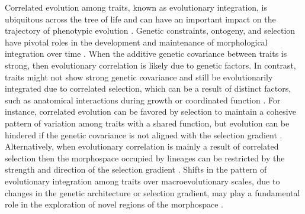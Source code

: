Correlated evolution among traits, known as evolutionary integration, is ubiquitous across the tree of life and can have an important impact on the trajectory of phenotypic evolution \citep{Olson_Miller_1958, klingenberg_evolutionary_2013, armbruster_integrated_2014, klingenberg_review_2014, goswami_macroevolutionary_2014, goswami_fossil_2015, melo_modularity:_2016}. Genetic constraints, ontogeny, and selection have pivotal roles in the development and maintenance of morphological integration over time \citep{arnold_constraints_1992, arnold_adaptive_2001, pigliucci_evolvability_2004, goswami_fossil_2015, melo_modularity:_2016}. When the additive genetic covariance between traits is strong, then evolutionary correlation is likely due to genetic factors. In contrast, traits might not show strong genetic covariance and still be evolutionarily integrated due to correlated selection, which can be a result of distinct factors, such as anatomical interactions during growth or coordinated function \citep{armbruster_causes_1996, armbruster_integrated_2014}. For instance, correlated evolution can be favored by selection to maintain a cohesive pattern of variation among traits with a shared function, but evolution can be hindered if the genetic covariance is not aligned with the selection gradient \citep{lande_quantitative_1979, schluter_adaptive_1996, villmoare_morphological_2012, goswami_macroevolutionary_2014}. Alternatively, when evolutionary correlation is mainly a result of correlated selection then the morphospace occupied by lineages can be restricted by the strength and direction of the selection gradient \citep{felsenstein_phylogenies_1988, armbruster_causes_1996}. Shifts in the pattern of evolutionary integration among traits over macroevolutionary scales, due to changes in the genetic architecture or selection gradient, may play a fundamental role in the exploration of novel regions of the morphospace \citep{young_serial_2005, goswami_cranial_2006, revell_phylogenetic_2009, monteiro_adaptive_2010, hallgrimsson_generation_2012, claverie_modularity_2013}. 

